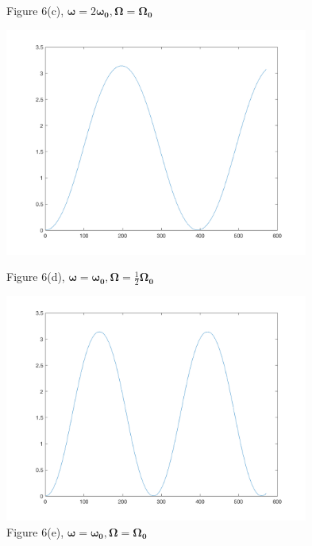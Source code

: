 \documentclass[12pt]{article}
\renewcommand{\(}{\left (}
\renewcommand{\)}{\right )}
\renewcommand{\vec}[1]{\boldsymbol{#1}}
\begin{document}
\begin{figure}[ht]
\begin{minipage}{0.33\textwidth}
		\caption*{\small Figure 6(c), $\vec{\omega} = 2\vec{\omega_0}, \vec{\Omega} = \vec{\Omega_0}$}
	\end{minipage}
	\begin{minipage}{0.33\textwidth}
		\centering
		\includegraphics[width=0.89\textwidth]{E500.png}
		\caption*{\small Figure 6(d), $\vec{\omega} = \vec{\omega_0}, \vec{\Omega} = \frac{1}{2}\vec{\Omega_0}$}
	\end{minipage}
	\begin{minipage}{0.33\textwidth}
		\centering
		\includegraphics[width=0.89\textwidth]{E1000.png}
		\caption*{\small Figure 6(e), $\vec{\omega} = \vec{\omega_0}, \vec{\Omega} = \vec{\Omega_0}$}
	\end{minipage}
	\begin{minipage}{0.33\textwidth}
		\centering

\end{minipage}
\end{figure}
\end{document}
